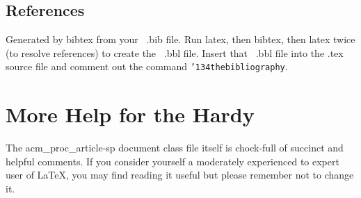 \documentclass{sig-alternate}
\begin{document}
\subsection{References}
Generated by bibtex from your ~.bib file.  Run latex,
then bibtex, then latex twice (to resolve references)
to create the ~.bbl file.  Insert that ~.bbl file into
the .tex source file and comment out
the command \texttt{{\char'134}thebibliography}.
\section{More Help for the Hardy}
The acm\_proc\_article-sp document class file itself is chock-full of succinct
and helpful comments.  If you consider yourself a moderately
experienced to expert user of \LaTeX, you may find reading
it useful but please remember not to change it.
\balancecolumns
\end{document}

